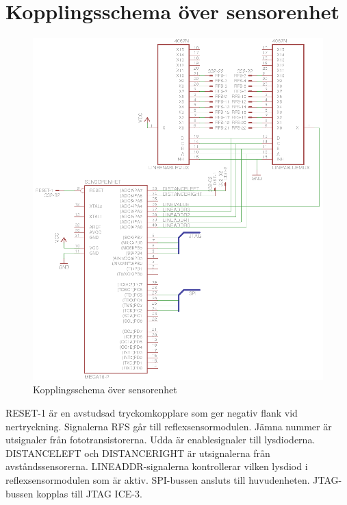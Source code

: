 \section{Kopplingsschema över sensorenhet}

\begin{figure}[h]
\center
\includegraphics{sensorenhet}
\caption{Kopplingsschema över sensorenhet}
\end{figure}

RESET-1 är en avstudsad tryckomkopplare som ger negativ flank vid nertryckning. Signalerna RFS går till reflexsensormodulen. Jämna nummer är utsignaler från fototransistorerna. Udda är enablesignaler till lysdioderna. DISTANCELEFT och DISTANCERIGHT är utsignalerna från avståndssensorerna. LINEADDR-signalerna kontrollerar vilken lysdiod i reflexsensormodulen som är aktiv. SPI-bussen ansluts till huvudenheten. JTAG-bussen kopplas till JTAG ICE-3.
